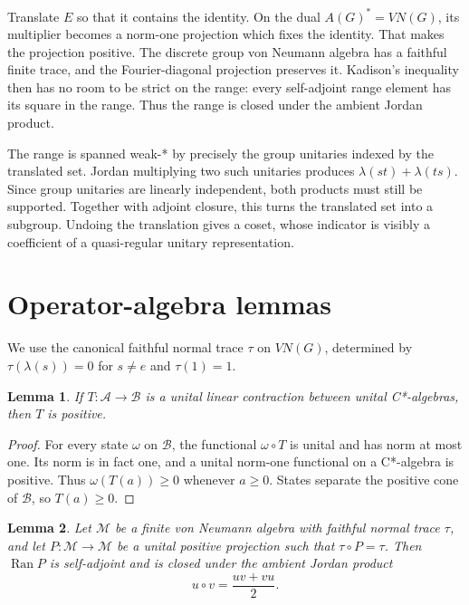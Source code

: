 \documentclass[11pt]{article}
\newtheorem{lemma}{Lemma}
\newcommand{\Ran}{\operatorname{Ran}}
\begin{document}
Translate $E$ so that it contains the identity.  On the dual
$A(G)^*=VN(G)$, its multiplier becomes a norm-one projection which fixes the
identity.  That makes the projection positive.  The discrete group von
Neumann algebra has a faithful finite trace, and the Fourier-diagonal
projection preserves it.  Kadison's inequality then has no room to be strict
on the range: every self-adjoint range element has its square in the range.
Thus the range is closed under the ambient Jordan product.

The range is spanned weak-* by precisely the group unitaries indexed by the
translated set.  Jordan multiplying two such unitaries produces
$\lambda(st)+\lambda(ts)$.  Since group unitaries are linearly independent,
both products must still be supported.  Together with adjoint closure, this
turns the translated set into a subgroup.  Undoing the translation gives a
coset, whose indicator is visibly a coefficient of a quasi-regular unitary
representation.

\section{Operator-algebra lemmas}

We use the canonical faithful normal trace $\tau$ on $VN(G)$, determined by
$\tau(\lambda(s))=0$ for $s\ne e$ and $\tau(1)=1$.

\begin{lemma}\label{lem:positive}
If $T:\mathcal A\to\mathcal B$ is a unital linear contraction between unital
C*-algebras, then $T$ is positive.
\end{lemma}

\begin{proof}
For every state $\omega$ on $\mathcal B$, the functional $\omega\circ T$ is
unital and has norm at most one.  Its norm is in fact one, and a unital
norm-one functional on a C*-algebra is positive.  Thus
$\omega(T(a))\ge0$ whenever $a\ge0$.  States separate the positive cone of
$\mathcal B$, so $T(a)\ge0$.
\end{proof}

\begin{lemma}\label{lem:jordan}
Let $\mathcal M$ be a finite von Neumann algebra with faithful normal trace
$\tau$, and let $P:\mathcal M\to\mathcal M$ be a unital positive projection
such that $\tau\circ P=\tau$. Then $\Ran P$ is self-adjoint and is closed under
the ambient Jordan product
\[
 u\circ v=\frac{uv+vu}{2}.
\]
\end{lemma}
\end{document}
